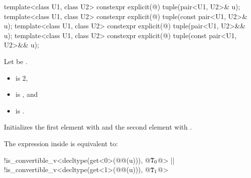 \documentclass{wg21}
\begin{document}
%
\begin{itemdecl}
    template<class U1, class U2> constexpr explicit(@\seebelow@) tuple(pair<U1, U2>& u);
    template<class U1, class U2> constexpr explicit(@\seebelow@) tuple(const pair<U1, U2>& u);
    template<class U1, class U2> constexpr explicit(@\seebelow@) tuple(pair<U1, U2>&& u);
    template<class U1, class U2> constexpr explicit(@\seebelow@) tuple(const pair<U1, U2>&& u);
\end{itemdecl}

\begin{itemdescr}
    \pnum
    Let  be .

    \pnum
    \constraints
    \begin{itemize}
        \item
         is 2,
        \item
         is , and
        \item
         is .
    \end{itemize}

    \pnum
    \effects
    Initializes the first element with  and
    the second element with .

    \pnum
    \remarks
    The expression inside  is equivalent to:
    \begin{codeblock}
        !is_convertible_v<decltype(get<0>(@@(u))), @$\texttt{T}_0$@> ||
        !is_convertible_v<decltype(get<1>(@@(u))), @$\texttt{T}_1$@>
    \end{codeblock}
\end{itemdescr}
\end{document}
